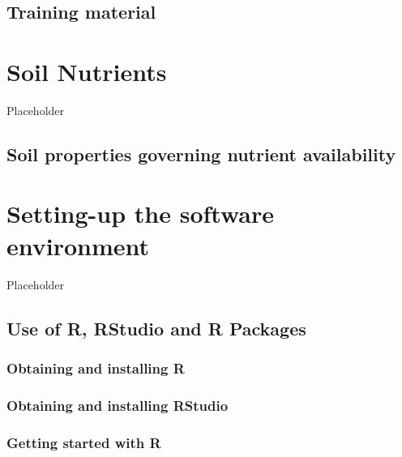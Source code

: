 \documentclass[
  10pt,
  b5paper,
  oneside]{book}
\begin{document}
\hypertarget{training-material}{%
\section{Training material}\label{training-material}}

\hypertarget{soil-nutrients}{%
\chapter{Soil Nutrients}\label{soil-nutrients}}

Placeholder

\hypertarget{soil-properties-governing-nutrient-availability}{%
\section{Soil properties governing nutrient availability}\label{soil-properties-governing-nutrient-availability}}

\hypertarget{setting-up-the-software-environment}{%
\chapter{Setting-up the software environment}\label{setting-up-the-software-environment}}

Placeholder

\hypertarget{use-of-r-rstudio-and-r-packages}{%
\section{Use of R, RStudio and R Packages}\label{use-of-r-rstudio-and-r-packages}}

\hypertarget{obtaining-and-installing-r}{%
\subsection{Obtaining and installing R}\label{obtaining-and-installing-r}}

\hypertarget{obtaining-and-installing-rstudio}{%
\subsection{Obtaining and installing RStudio}\label{obtaining-and-installing-rstudio}}

\hypertarget{getting-started-with-r}{%
\subsection{Getting started with R}\label{getting-started-with-r}}
\end{document}
